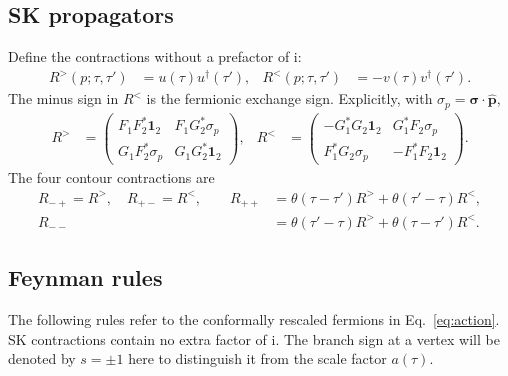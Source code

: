 \documentclass[a4paper,12pt]{article}
\newcommand{\ii}{\mathrm i}
\newcommand{\bs}{\bm\sigma}
\newcommand{\one}{\mathbf1_2}
\newcommand{\G}{\mathcal G}
\begin{document}
\subsection{SK propagators}
Define the contractions without a prefactor of $\ii$:
\begin{align}
 R^>(p;\tau,\tau')&=u(\tau)u^\dagger(\tau'),&
 R^<(p;\tau,\tau')&=-v(\tau)v^\dagger(\tau').
 \label{eq:wightman}
\end{align}
The minus sign in $R^<$ is the fermionic exchange sign. Explicitly, with
$\sigma_p=\bs\cdot\hat{\bm p}$,
\begin{align}
 R^>&=\begin{pmatrix}F_1F_2^*\one&F_1G_2^*\sigma_p\\G_1F_2^*\sigma_p&G_1G_2^*\one\end{pmatrix},&
 R^<&=\begin{pmatrix}-G_1^*G_2\one&G_1^*F_2\sigma_p\\F_1^*G_2\sigma_p&-F_1^*F_2\one\end{pmatrix}.
 \label{eq:Rblocks}
\end{align}
The four contour contractions are
\begin{align}
 R_{-+}=R^>,\quad R_{+-}=R^<,\qquad
 R_{++}&=\theta(\tau-\tau')R^>+\theta(\tau'-\tau)R^<,\\
 R_{--}&=\theta(\tau'-\tau)R^>+\theta(\tau-\tau')R^<.
 \label{eq:sk}
\end{align}
\subsection{Feynman rules}
The following rules refer to the conformally rescaled fermions in
Eq.~\eqref{eq:action}. SK contractions contain no extra factor of $\ii$.
The branch sign at a vertex will be denoted by $s=\pm1$ here to distinguish it
from the scale factor $a(\tau)$.
\end{document}
